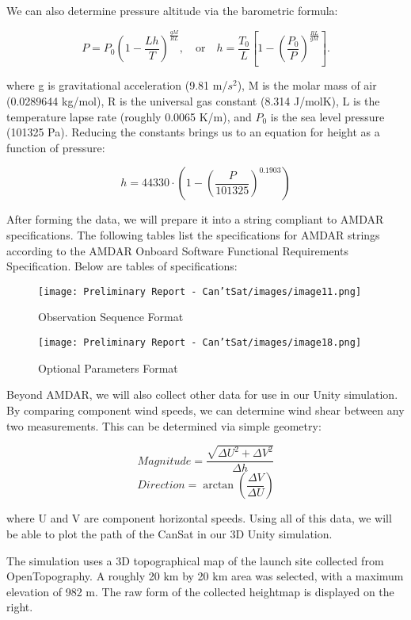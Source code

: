 \documentclass[10pt,twocolumn]{article}
\begin{document}
We can also determine pressure altitude via the barometric formula:

\[
P = P_0 \left(1 - \frac{Lh}{T} \right)^{\frac{gM}{RL}}, \quad \text{or} \quad 
h = \frac{T_0}{L} \left[1 - \left(\frac{P_0}{P} \right)^{\frac{RL}{gM}} \right].
\]

where g is gravitational acceleration (9.81 m/$s^2$), M is the molar mass of air (0.0289644 kg/mol), R is the universal gas constant (8.314 J/molK), L is the temperature lapse rate (roughly 0.0065 K/m), and $P_0$ is the sea level pressure (101325 Pa). Reducing the constants brings us to an equation for height as a function of pressure:

\[
h = 44330 \cdot (1 - (\frac{P}{101325})^{0.1903})
\]

After forming the data, we will prepare it into a string compliant to AMDAR specifications. The following tables list the specifications for AMDAR strings according to the AMDAR Onboard Software Functional Requirements Specification. Below are tables of specifications:

\begin{figure}[H]
\centering
\texttt{[image: Preliminary Report - Can'tSat/images/image11.png]}  
\caption{\label{fig:Table19} Observation Sequence Format }
\end{figure}

\begin{figure}[H]
\centering
\texttt{[image: Preliminary Report - Can'tSat/images/image18.png]}  
\caption{\label{fig:Table20} Optional Parameters Format}
\end{figure}

Beyond AMDAR, we will also collect other data for use in our Unity simulation. By comparing component wind speeds, we can determine wind shear between any two measurements. This can be determined via simple geometry:

\[
\textit{Magnitude} = \frac{\sqrt{\Delta U^2 + \Delta V^2}}{\Delta h} 
\]
\[
\textit{Direction} = \arctan\left(\frac{\Delta V}{\Delta U}\right)
\]

where U and V are component horizontal speeds. Using all of this data, we will be able to plot the path of the CanSat in our 3D Unity simulation.

The simulation uses a 3D topographical map of the launch site collected from OpenTopography. A roughly 20 km by 20 km area was selected, with a maximum elevation of 982 m. The raw form of the collected heightmap is displayed on the right.
\end{document}
